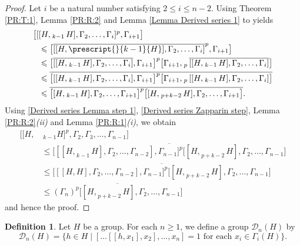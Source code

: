 \documentclass[12pt]{elsarticle}
\newtheorem*{main corollary*}{Main Corollary}
\theoremstyle{definition}
\newtheorem{definition}[theorem]{Definition}
\begin{document}
\begin{proof}
        Let $i$ be a natural number satisfying $2 \leq i \leq n-2$. Using Theorem \ref{PR:T:1}, Lemma \ref{PR:R:2} and Lemma \ref{Lemma Derived series 1} to   yields
        \begin{align} 
        \bigl[[&[H,_{\;k-1}H],\Gamma_2,\dots, \Gamma_i]^p,\Gamma_{i+1}\bigr]\nonumber\\
        &\leqslant\bigl[\overline{[[H,\prescript{}{k-1}{H}],\Gamma_2,\dots, \Gamma_i]}^p,\Gamma_{i+1}\bigr]\nonumber\\
            &\leqslant \bigl[\overline{[[H,_{\;k-1}H],\Gamma_2,\dots, \Gamma_i]},\Gamma_{i+1}\bigr]^p\bigr[\Gamma_{i+1},_{\;p}\overline{[[H,_{\;k-1}H],\Gamma_2,\dots, \Gamma_{i}]}\bigl]\nonumber\\
            & \leqslant \overline{\bigl[[[H,_{\;k-1}H],\Gamma_2,\dots, \Gamma_i],\Gamma_{i+1}\bigr]^p\bigr[\Gamma_{i+1},_{\;p}[[H,_{\;k-1}H],\Gamma_2,\dots, \Gamma_{i}]\bigl]} \nonumber\\
            &\leqslant \overline{\bigl[[H,_{\;k-1}H],\Gamma_2,\dots, \Gamma_{i+1}\bigr]^p\bigr[[H,_{\;p+k-2}H],\Gamma_2,\dots,\Gamma_{i+1}\bigr]}.\label{Derived series Zapparin step}
        \end{align} 
        Using \eqref{Derived series Lemma step 1}, \eqref{Derived series Zapparin step}, Lemma \ref{PR:R:2}\textit{(ii)} and Lemma \ref{PR:R:1}\textit{(i)}, we obtain
        \begin{align*}
        \bigl[[H,&_{\;k-1}H]^p,\Gamma_2,\Gamma_3,\ldots,\Gamma_{n-1}\bigr]\\
        &\leqslant  \overline{\bigl[[[H,_{\;k-1}H],\Gamma_2,\ldots, \Gamma_{n-2}],\Gamma_{n-1}\bigr]^p\bigl[[H,_{\;p+k-2}H],\Gamma_2,\ldots,\Gamma_{n-1}\bigr]}\\
        &\leqslant \overline{\bigl[[[H,H],\Gamma_2,\ldots, \Gamma_{n-2}],\Gamma_{n-1}\bigr]^p\bigl[[H,_{\;p+k-2}H],\Gamma_2,\ldots,\Gamma_{n-1}\bigr]}\\
        &\leqslant \overline{(\Gamma_n)^p\bigl[[H,_{\;p+k-2}H],\Gamma_2,\ldots,\Gamma_{n-1}\bigr]}
        \end{align*}and hence the proof.
\end{proof}







\begin{definition}\cite[Definition 3.6]{Donadze21}\label{D_n(G)}
    Let $H$ be a group. For each $n\geq 1$, we define a group $\mathcal{D}_n(H)$ by\[\mathcal{D}_n(H)=\{h\in H\mid[\ldots[[h,x_1],x_2],\ldots,x_n]=1 \text{ for each }x_i\in \Gamma_i(H)\}.\]
\end{definition}
\end{document}
